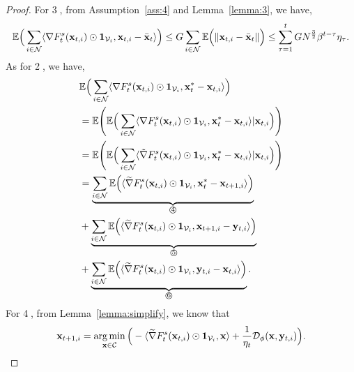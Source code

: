 \begin{proof}
		For \textcircled{3}, from  Assumption~\ref{ass:4} and  Lemma~\ref{lemma:3}, 
		we have, 
		\begin{equation}\label{equ:lemma_result_3}
			\mathbb{E}\Big(\sum_{i\in\mathcal{N}}\langle\nabla F_{t}^{s}(\mathbf{x}_{t,i})\odot\mathbf{1}_{\mathcal{V}_{i}},\mathbf{x}_{t,i}-\bar{\mathbf{x}}_{t}\rangle\Big)\le G\sum_{i\in\mathcal{N}}\mathbb{E}\Big(\|\mathbf{x}_{t,i}-\bar{\mathbf{x}}_{t}\|\Big)\le\sum_{\tau=1}^{t}GN^{\frac{3}{2}}\beta^{t-\tau}\eta_{\tau}.
		\end{equation}
		As for \textcircled{2},
		we have, %
		\begin{equation}\label{equ:lemma_result_2}
			\begin{aligned}
				&\mathbb{E}\Big(\sum_{i\in\mathcal{N}}\langle\nabla F_{t}^{s}(\mathbf{x}_{t,i})\odot\mathbf{1}_{\mathcal{V}_{i}},\mathbf{x}_{t}^{*}-\mathbf{x}_{t,i}\rangle\Big)\\
				&=\mathbb{E}\Bigg(\mathbb{E}\Big(\sum_{i\in\mathcal{N}}\langle\nabla F_{t}^{s}(\mathbf{x}_{t,i})\odot\mathbf{1}_{\mathcal{V}_{i}},\mathbf{x}^{*}_{t}-\mathbf{x}_{t,i}\rangle|\mathbf{x}_{t,i}\Big)\Bigg)\\
				&=\mathbb{E}\Bigg(\mathbb{E}\Big(\sum_{i\in\mathcal{N}}\langle\tilde{\nabla} F_{t}^{s}(\mathbf{x}_{t,i})\odot\mathbf{1}_{\mathcal{V}_{i}},\mathbf{x}^{*}_{t}-\mathbf{x}_{t,i}\rangle|\mathbf{x}_{t,i}\Big)\Bigg)\\
				&=\underbrace{\sum_{i\in\mathcal{N}}\mathbb{E}\Big(\langle\widetilde{\nabla} F_{t}^{s}(\mathbf{x}_{t,i})\odot\mathbf{1}_{\mathcal{V}_{i}},\mathbf{x}^{*}_{t}-\mathbf{x}_{t+1,i}\rangle\Big)}_{\text{\textcircled{4}}}\\
				&+\underbrace{\sum_{i\in\mathcal{N}}\mathbb{E}\Big(\langle\widetilde{\nabla} F_{t}^{s}(\mathbf{x}_{t,i})\odot\mathbf{1}_{\mathcal{V}_{i}},\mathbf{x}_{t+1,i}-\mathbf{y}_{t,i}\rangle\Big)}_{\text{\textcircled{5}}}\\
				&+\underbrace{\sum_{i\in\mathcal{N}}\mathbb{E}\Big(\langle\widetilde{\nabla} F_{t}^{s}(\mathbf{x}_{t,i})\odot\mathbf{1}_{\mathcal{V}_{i}},\mathbf{y}_{t,i}-\mathbf{x}_{t,i}\rangle\Big)}_{\text{\textcircled{6}}}.
			\end{aligned}
		\end{equation}
		For \textcircled{4}, from Lemma~\ref{lemma:simplify}, we know that
		\begin{equation*}
			\mathbf{x}_{t+1,i}=\mathop{\arg\min}_{\mathbf{x}\in\mathcal{C}}\Big(-\langle\widetilde{\nabla} F_{t}^{s}(\mathbf{x}_{t,i})\odot\mathbf{1}_{\mathcal{V}_{i}},\mathbf{x}\rangle+\frac{1}{\eta_{t}}\mathcal{D}_{\phi}(\mathbf{x}, \mathbf{y}_{t,i})\Big).
		\end{equation*} 
		

\end{proof}
